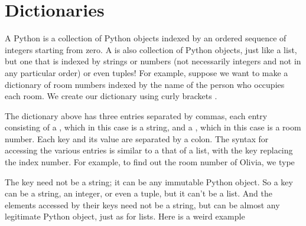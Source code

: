 \documentclass[letterpaper,10pt,english]{sphinxmanual}
\begin{document}
\ignorespaces 

\section{Dictionaries}
\label{\detokenize{chap3/chap3_arrays:dictionaries}}\label{\detokenize{chap3/chap3_arrays:chap3dictionaries}}\label{\detokenize{chap3/chap3_arrays:index-7}}
\sphinxAtStartPar
A Python  is a collection of Python objects indexed by an ordered sequence of integers starting from zero.  A  is also collection of Python objects, just like a list, but one that is indexed by strings or numbers (not necessarily integers and not in any particular order) or even tuples!  For example, suppose we want to make a dictionary of room numbers indexed by the name of the person who occupies each room.  We create our dictionary using curly brackets .

\begin{sphinxVerbatim}[commandchars=\\\{\}]
    
\end{sphinxVerbatim}

\sphinxAtStartPar
The dictionary above has three entries separated by commas, each entry consisting of a , which in this case is a string, and a , which in this case is a room number.  Each key and its value are separated by a colon.  The syntax for accessing the various entries is similar to a that of a list, with the key replacing the index number.  For example, to find out the room number of Olivia, we type

\begin{sphinxVerbatim}[commandchars=\\\{\}]
\PYG{p}{[}\PYG{p}{]}
\end{sphinxVerbatim}

\sphinxAtStartPar
The key need not be a string; it can be any immutable Python object.  So a key can be a string, an integer, or even a tuple, but it can’t be a list.  And the elements accessed by their keys need not be a string, but can be almost any legitimate Python object, just as for lists.  Here is a weird example
\end{document}
